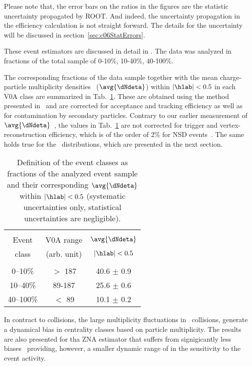 Please note that,
the error bars on the ratios in the figures are the statistic uncertainty
propagated by ROOT.
And indeed, the uncertainty propagation in the efficiency calculation is not
straight forward.
The details for the uncertainty will be discussed
in section~\ref{sec:c06StatErrors}.

These event estimators are discussed in detail in \cite{Adam:2014qja}. The data was analyzed in fractions of the total sample of 0-10\%, 10-40\%, 40-100\%.

The corresponding fractions of the data sample together with the mean charge-particle multiplicity densities ~($\avg{\dNdeta}$) within $| \hlab |<0.5$ in each V0A class are summarized in Tab.~\ref{tab:multclasses}.  
These are obtained using the method presented in~\cite{ALICE:2012xs} and are corrected for acceptance and
tracking efficiency as well as for contamination by secondary
particles. Contrary to our earlier measurement of $\avg{\dNdeta}$~\cite{ALICE:2012xs}, the values
in Tab.~\ref{tab:multclasses} are not corrected for trigger and
vertex-reconstruction efficiency, which is of the order of 2\% for NSD
events~\cite{ALICE:2012xs}. The same holds true for the \pt\
distributions, which are presented in the next section.

\begin{table}[t] 
  \centering
  \begin{tabular*}{\linewidth}{@{\extracolsep{\fill}}ccc}
    \hline
    &&\\[-0.7em]
     Event & V0A range & $\avg{\dNdeta}$\\
     class & \footnotesize{(arb. unit)} & \footnotesize{$|\hlab|<0.5$}\\[0.3em]
    \hline
    &&\\[-0.7em]
    0--10\%   & $>$ 187  & 40.6 $\pm$ 0.9 \\[0.3em]
    10--40\%  & 89-187   & 25.6 $\pm$ 0.6 \\[0.3em]
    40--100\% & $<$ 89   & 10.1 $\pm$ 0.2 \\[0.3em]
    \hline
  \end{tabular*}
  \caption{Definition of the event classes as fractions of the analyzed event sample and their corresponding $\avg{\dNdeta}$ within $|\hlab|<0.5$ (systematic uncertainties only, statistical uncertainties are negligible).  }
  \label{tab:multclasses}
\end{table}

In contract to \PbPb collisions, the large multiplicity fluctuations in \pPb\ collisions, generate a dynamical bias in centrality classes based on particle multiplicity.
The results are also presented for tha ZNA estimator that suffers from signigicantly less biases~\cite{Adam:2014qja} providing, however, a smaller dynamic range of in the sensitivity to the event activity.


